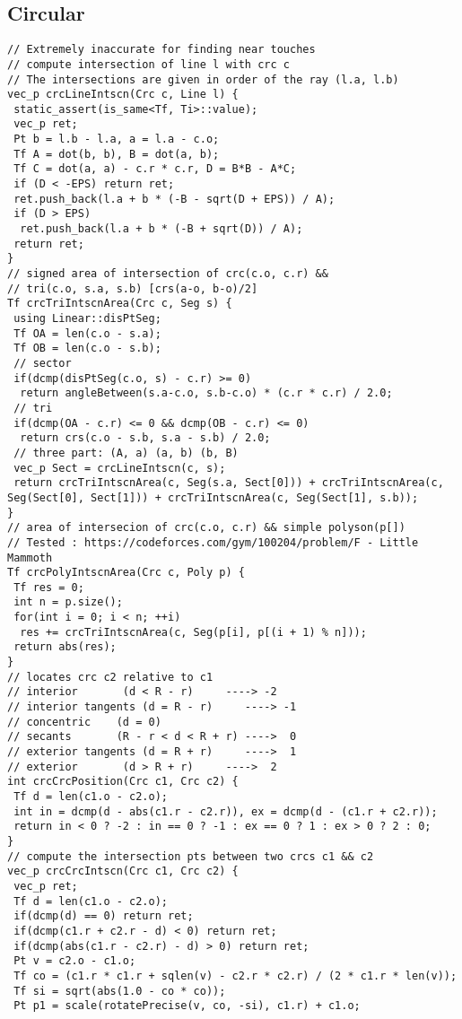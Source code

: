 \documentclass[a4paper,11pt,oneside]{article}
\begin{document}
\begin{multicols*}{\COLS}
\subsection{Circular}
\begin{lstlisting}
// Extremely inaccurate for finding near touches
// compute intersection of line l with crc c
// The intersections are given in order of the ray (l.a, l.b)
vec_p crcLineIntscn(Crc c, Line l) {
 static_assert(is_same<Tf, Ti>::value);
 vec_p ret;
 Pt b = l.b - l.a, a = l.a - c.o;
 Tf A = dot(b, b), B = dot(a, b);
 Tf C = dot(a, a) - c.r * c.r, D = B*B - A*C;
 if (D < -EPS) return ret;
 ret.push_back(l.a + b * (-B - sqrt(D + EPS)) / A);
 if (D > EPS)
  ret.push_back(l.a + b * (-B + sqrt(D)) / A);
 return ret;
}
// signed area of intersection of crc(c.o, c.r) &&
// tri(c.o, s.a, s.b) [crs(a-o, b-o)/2]
Tf crcTriIntscnArea(Crc c, Seg s) {
 using Linear::disPtSeg;
 Tf OA = len(c.o - s.a);
 Tf OB = len(c.o - s.b);
 // sector
 if(dcmp(disPtSeg(c.o, s) - c.r) >= 0)
  return angleBetween(s.a-c.o, s.b-c.o) * (c.r * c.r) / 2.0;
 // tri
 if(dcmp(OA - c.r) <= 0 && dcmp(OB - c.r) <= 0)
  return crs(c.o - s.b, s.a - s.b) / 2.0;
 // three part: (A, a) (a, b) (b, B)
 vec_p Sect = crcLineIntscn(c, s);
 return crcTriIntscnArea(c, Seg(s.a, Sect[0])) + crcTriIntscnArea(c, Seg(Sect[0], Sect[1])) + crcTriIntscnArea(c, Seg(Sect[1], s.b));
}
// area of intersecion of crc(c.o, c.r) && simple polyson(p[])
// Tested : https://codeforces.com/gym/100204/problem/F - Little Mammoth
Tf crcPolyIntscnArea(Crc c, Poly p) {
 Tf res = 0;
 int n = p.size();
 for(int i = 0; i < n; ++i)
  res += crcTriIntscnArea(c, Seg(p[i], p[(i + 1) % n]));
 return abs(res);
}
// locates crc c2 relative to c1
// interior       (d < R - r)     ----> -2
// interior tangents (d = R - r)     ----> -1
// concentric    (d = 0)
// secants       (R - r < d < R + r) ---->  0
// exterior tangents (d = R + r)     ---->  1
// exterior       (d > R + r)     ---->  2
int crcCrcPosition(Crc c1, Crc c2) {
 Tf d = len(c1.o - c2.o);
 int in = dcmp(d - abs(c1.r - c2.r)), ex = dcmp(d - (c1.r + c2.r));
 return in < 0 ? -2 : in == 0 ? -1 : ex == 0 ? 1 : ex > 0 ? 2 : 0;
}
// compute the intersection pts between two crcs c1 && c2
vec_p crcCrcIntscn(Crc c1, Crc c2) {
 vec_p ret;
 Tf d = len(c1.o - c2.o);
 if(dcmp(d) == 0) return ret;
 if(dcmp(c1.r + c2.r - d) < 0) return ret;
 if(dcmp(abs(c1.r - c2.r) - d) > 0) return ret;
 Pt v = c2.o - c1.o;
 Tf co = (c1.r * c1.r + sqlen(v) - c2.r * c2.r) / (2 * c1.r * len(v));
 Tf si = sqrt(abs(1.0 - co * co));
 Pt p1 = scale(rotatePrecise(v, co, -si), c1.r) + c1.o;

\end{lstlisting}
\end{multicols*}
\end{document}
